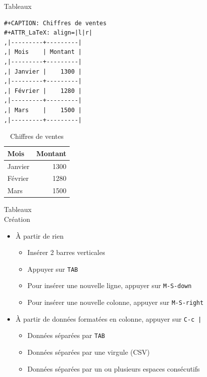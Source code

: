 \documentclass[presentation,t,hideothersubsections]{beamer}
\begin{document}
\begin{frame}[fragile,label=sec-3-3-1]{Tableaux}
 \lstset{language=org,numbers=none}
\begin{lstlisting}
#+CAPTION: Chiffres de ventes
#+ATTR_LaTeX: align=|l|r|
,|---------+---------|
,| Mois    | Montant |
,|---------+---------|
,| Janvier |    1300 |
,|---------+---------|
,| Février |    1280 |
,|---------+---------|
,| Mars    |    1500 |
,|---------+---------|
\end{lstlisting}

\begin{table}[!htbp]
\caption{Chiffres de ventes}
\centering
\begin{tabular}{lr}
\hline
Mois & Montant\\
\hline
Janvier & 1300\\
\hline
Février & 1280\\
\hline
Mars & 1500\\
\hline
\end{tabular}
\end{table}
\end{frame}
\begin{frame}[fragile,label=sec-3-3-2]{Tableaux \\ Création}
 \begin{itemize}
\item À partir de rien
\begin{itemize}
\item Insérer 2 barres verticales
\item Appuyer sur \texttt{TAB}
\item Pour insérer une nouvelle ligne, appuyer sur \texttt{M-S-down}
\item Pour insérer une nouvelle colonne, appuyer sur \texttt{M-S-right}
\end{itemize}

\item À partir de données formatées en colonne, appuyer sur \texttt{C-c |}
\begin{itemize}
\item Données séparées par \texttt{TAB}
\item Données séparées par une virgule (CSV)
\item Données séparées par un ou plusieurs espaces consécutifs
\end{itemize}
\end{itemize}
\end{frame}
\end{document}
